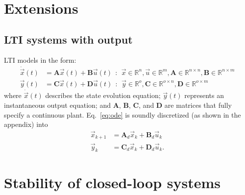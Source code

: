 \documentclass[runningheads,a4paper]{llncs}
\newcommand{\mat}[1]{\boldsymbol{#1}}
\begin{document}


\section{Extensions}
\label{sec:extensions}

\subsection{LTI systems with output} 
\label{ssec:LTI}

LTI models in the form: 
%
\begin{align}
\dot{\vec{x}}(t)&=\mat{A}\vec{x}(t)+\mat{B}\vec{u}(t)\ \ :\ \ \vec{x} \in \mathbb{R}^{n}, \vec{u} \in \mathbb{R}^m, \mat{A} \in \mathbb{R}^{n \times n},\mat{B} \in \mathbb{R}^{n \times m}\\
\vec{y}(t)&=\mat{C}\vec{x}(t)+\mat{D}\vec{u}(t)\ \ :\ \ \vec{y} \in \mathbb{R}^{o}, \mat{C} \in \mathbb{R}^{o \times n}, \mat{D}  \in \mathbb{R}^{o \times m}\nonumber
\end{align}
\noindent where $\dot{\vec{x}}(t)$ describes the state evolution equation; 
$\vec{y}(t)$ represents an instantaneous output equation; and $\mat{A}$, $\mat{B}$, $\mat{C}$, and $\mat{D}$ are matrices that fully specify 
a continuous plant. Eq.~\eqref{eq:ode} is soundly discretized 
(as shown in the appendix) into
%
\begin{align}
\vec{x}_{k+1}&=\mat{A}_d\vec{x}_k+\mat{B}_d\vec{u}_k\\
\vec{y}_k&=\mat{C}_d\vec{x}_k+\mat{D}_d\vec{u}_k .\nonumber
\end{align}
%


\newpage


  

\newpage
\appendix
\section{Stability of closed-loop systems}
\label{sec:appendix-stability}
\end{document}
